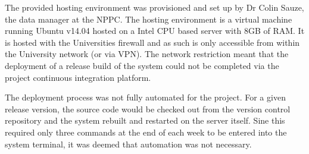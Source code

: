 The provided hosting environment was provisioned and set up by Dr Colin Sauze, the data manager at the NPPC. The hosting environment is a virtual machine running Ubuntu v14.04 hosted on a Intel CPU based server with 8GB of RAM. It is hosted with the Universities firewall and as such is only accessible from within the University network (or via VPN). The network restriction meant that the deployment of a release build of the system could not be completed via the project continuous integration platform. 

The deployment process was not fully automated for the project. For a given release version, the source code would be checked out from the version control repository and the system rebuilt and restarted on the server itself. Sine this required only three commands at the end of each week to be entered into the system terminal, it was deemed that automation was not necessary.
